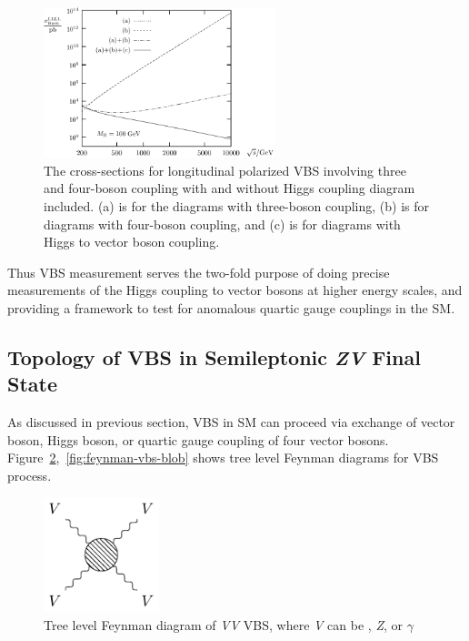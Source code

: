 \begin{figure}[!ht]
  \centering
  \includegraphics[width=0.6\textwidth]{figures/unitarity.pdf}
  \caption[The cross-sections for longitudinal polarized \gls{VBS} involving three
    and four-boson coupling with and without Higgs coupling included.]%
  {The cross-sections for longitudinal polarized \gls{VBS} involving three
    and four-boson coupling with and without Higgs coupling diagram included.
    (a) is for the diagrams with three-boson coupling,
    (b) is for diagrams with four-boson coupling, and (c) is for diagrams
    with Higgs to vector boson coupling.~\cite{Denner1997}}%
  \label{fig:vbs-at-high-energies}
\end{figure}


Thus \gls{VBS} measurement serves the two-fold purpose of
doing precise measurements of the Higgs coupling to vector bosons
at higher energy scales,
and providing a framework to test for anomalous quartic gauge
couplings in the \gls{SM}.


\subsection{
  Topology of VBS in Semileptonic \textit{ZV} Final State
}

As discussed in previous section, \gls{VBS} in \gls{SM} can
proceed via exchange of vector boson, Higgs
boson, or quartic gauge coupling of four vector bosons.
Figure~\ref{fig:feynman-vbs-general},~\ref{fig:feynman-vbs-blob}
shows tree level Feynman diagrams for \gls{VBS} process.

\begin{figure}[!ht]
  \centering
  \includegraphics[width=0.3\textwidth]{figures/feyn_vbs_general.pdf}
  \caption[Tree level Feynman diagram of \textit{VV} \gls{VBS}]%
  {Tree level Feynman diagram of \textit{VV} \gls{VBS},
    where \textit{V} can be \Wplusminus{}, \textit{Z}, or \( \gamma \)}%
  \label{fig:feynman-vbs-general}
\end{figure}

